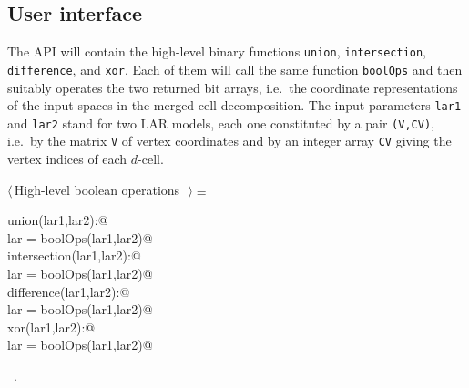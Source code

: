 \documentclass[11pt,oneside]{article}	%
\begin{document}
\subsection{User interface}

The API will contain the high-level binary functions \texttt{union}, \texttt{intersection}, \texttt{difference}, and \texttt{xor}. Each of them will call the same function \texttt{boolOps} and then suitably operates the two returned bit arrays, i.e.~the coordinate representations of the input spaces in the merged cell decomposition. The input parameters \texttt{lar1} and  \texttt{lar2} stand for two LAR models, each one constituted by a pair \texttt{(V,CV)}, i.e.~by the matrix \texttt{V} of vertex coordinates and by an integer array \texttt{CV} giving the vertex indices of each $d$-cell.

\begin{flushleft} \small \label{scrap1}
$\langle\,$High-level boolean operations\nobreak\ {\footnotesize {}}$\,\rangle\equiv$
\vspace{-1ex}
\begin{list}{}{} \item
\mbox{}\verb@def union(lar1,lar2):@\\
\mbox{}\verb@   lar = boolOps(lar1,lar2)@\\
\mbox{}\verb@def intersection(lar1,lar2):@\\
\mbox{}\verb@   lar = boolOps(lar1,lar2)@\\
\mbox{}\verb@def difference(lar1,lar2):@\\
\mbox{}\verb@   lar = boolOps(lar1,lar2)@\\
\mbox{}\verb@def xor(lar1,lar2):@\\
\mbox{}\verb@   lar = boolOps(lar1,lar2)@\\
\mbox{}\verb@@{\NWsep}
\end{list}
\vspace{-1ex}
\footnotesize\addtolength{\baselineskip}{-1ex}
\begin{list}{}{\setlength{\itemsep}{-\parsep}\setlength{\itemindent}{-\leftmargin}}
\item \NWtxtMacroRefIn\ .
\end{list}
\end{flushleft}

\end{document}
